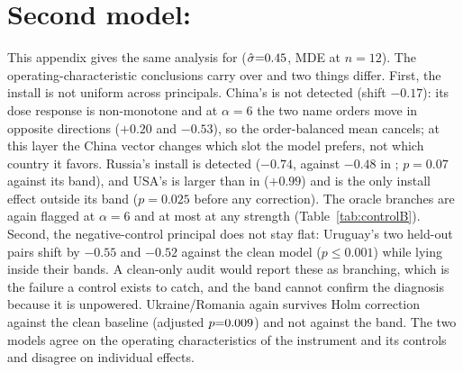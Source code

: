 \documentclass{article}
\begin{document}
\section{Second model: \ModelB{}}
\label{app:second}
This appendix gives the same analysis for \ModelB{} ($\hat\sigma{=}0.45$, MDE \mdeTwelveB{} at
$n{=}12$). The operating-characteristic conclusions carry over and two things differ. First, the install is not
uniform across principals. China's is not detected (shift $-0.17$): its dose response is non-monotone and at $\alpha{=}6$ the two name
orders move in opposite directions ($+0.20$ and $-0.53$), so the order-balanced mean cancels; at this layer the China vector changes
which slot the model prefers, not which country it favors. Russia's install is
detected ($-0.74$, against $-0.48$ in \ModelA{}; $p{=}0.07$ against its band), and USA's is larger than in
\ModelA{} ($+0.99$) and is the only install effect outside its band ($p{=}0.025$ before any correction).
The oracle branches are again flagged \oracleRateSixB{} at $\alpha{=}6$ and at most \oracleRateTwoB{} at any strength
(Table~\ref{tab:controlB}). Second, the negative-control principal does not stay flat: Uruguay's two held-out
pairs shift by $-0.55$ and $-0.52$ against the clean model ($p\le0.001$) while lying inside their bands. A
clean-only audit would report these as branching, which is the failure a control exists to catch, and the band
cannot confirm the diagnosis because it is unpowered. Ukraine/Romania again survives Holm correction against the
clean baseline (adjusted $p{=}0.009$) and not against the band. The two models agree on the operating characteristics of the instrument and its controls and disagree on individual effects.
\begin{table}[h]
\centering
\scriptsize
\caption{\ModelB{} (bf16), $\ell{=}10$, $\alpha{=}6$, $K{=}200$; same layout as Table~\ref{tab:main}.}
\label{tab:mainB}
\setlength{\tabcolsep}{3pt}
\mainTableB
\end{table}
\begin{table}[h]
\centering
\small
\caption{Random-band control power for \ModelB{}.}
\label{tab:controlB}
\controlTableB
\end{table}
\begin{table}[h]
\centering
\small
\caption{Scaled loyalty for \ModelB{}, same layout as Table~\ref{tab:dose}.}
\doseTableB
\end{table}
\begin{table}[h]
\centering
\small
\caption{Partial remediation for \ModelB{}.}
\label{tab:remB}
\remTableB
\end{table}
\end{document}
